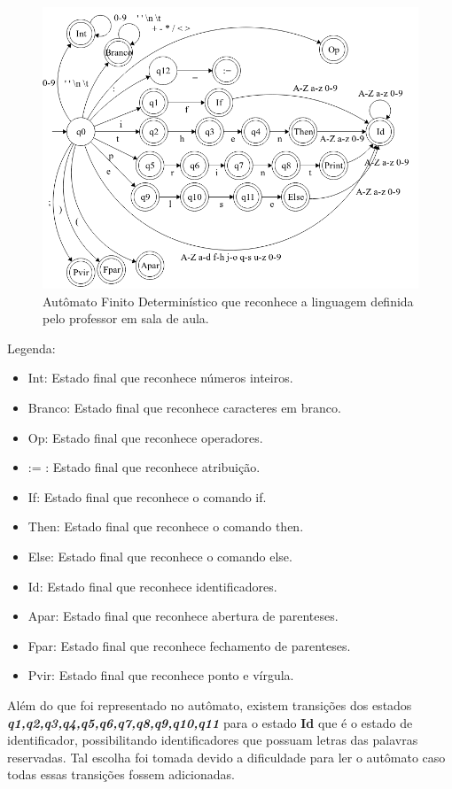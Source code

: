 \documentclass[hidelinks,12pt]{article}
\begin{document}
	\begin{figure}[h!]
		\centering
		\includegraphics[scale=0.5]{Figures/automato}
		\caption{Autômato Finito Determinístico que reconhece a linguagem definida pelo professor em sala de aula.}
	\end{figure}
	
	\newpage
	Legenda:
	
	
	\begin{itemize}
	\item Int: Estado final que reconhece números inteiros.
	\item Branco: Estado final que reconhece caracteres em branco.
	\item Op: Estado final que reconhece operadores.
	\item := : Estado final que reconhece atribuição.
	\item If: Estado final que reconhece o comando if.
	\item Then: Estado final que reconhece o comando then.
	\item Else: Estado final que reconhece o comando else.
	\item Id: Estado final que reconhece identificadores.
	\item Apar: Estado final que reconhece abertura de parenteses.
	\item Fpar: Estado final que reconhece fechamento de parenteses.
	\item Pvir: Estado final que reconhece ponto e vírgula.
	\end{itemize}
	
	Além do que foi representado no autômato, existem transições dos estados \textbf{\textit{q1,q2,q3,q4,q5,q6,q7,q8,q9,q10,q11}} para o estado \textbf{Id} que é o estado de identificador, possibilitando identificadores que possuam letras das palavras reservadas. Tal escolha foi tomada devido a dificuldade para ler o autômato caso todas essas transições fossem adicionadas. 
	
\end{document}
